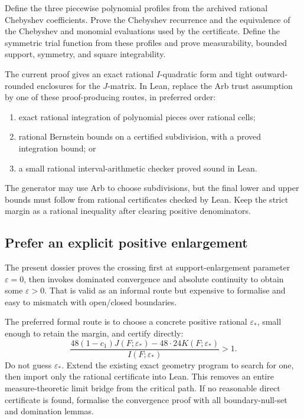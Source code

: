 \documentclass[11pt]{article}
\begin{document}
Define the three piecewise polynomial profiles from the archived rational
Chebyshev coefficients.  Prove the Chebyshev recurrence and the equivalence of
the Chebyshev and monomial evaluations used by the certificate.  Define the
symmetric trial function from these profiles and prove measurability, bounded
support, symmetry, and square integrability.

The current proof gives an exact rational \(I\)-quadratic form and tight
outward-rounded enclosures for the \(J\)-matrix.  In Lean, replace the Arb
trust assumption by one of these proof-producing routes, in preferred order:

\begin{enumerate}
\item exact rational integration of polynomial pieces over rational cells;
\item rational Bernstein bounds on a certified subdivision, with a proved
  integration bound; or
\item a small rational interval-arithmetic checker proved sound in Lean.
\end{enumerate}

The generator may use Arb to choose subdivisions, but the final lower and upper
bounds must follow from rational certificates checked by Lean.  Keep the strict
margin as a rational inequality after clearing positive denominators.

\subsection{Prefer an explicit positive enlargement}

The present dossier proves the crossing first at support-enlargement parameter
\(\varepsilon=0\), then invokes dominated convergence and absolute continuity
to obtain some \(\varepsilon>0\).  That is valid as an informal route but
expensive to formalise and easy to mismatch with open/closed boundaries.

The preferred formal route is to choose a concrete positive rational
\(\varepsilon_*\), small enough to retain the margin, and certify directly:
\[
 \frac{48(1-c_1)J(F;\varepsilon_*)-
       48\cdot24 K(F;\varepsilon_*)}{I(F;\varepsilon_*)}>1.
\]
Do not guess \(\varepsilon_*\).  Extend the existing exact geometry program to
search for one, then import only the rational certificate into Lean.  This
removes an entire measure-theoretic limit bridge from the critical path.  If no
reasonable direct certificate is found, formalise the convergence proof with
all boundary-null-set and domination lemmas.
\end{document}
